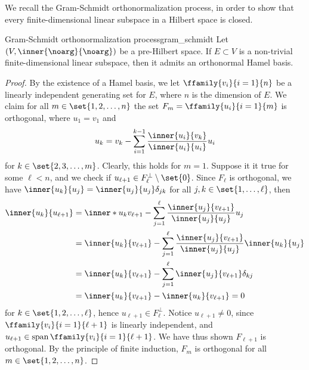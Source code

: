 We recall the Gram-Schmidt orthonormalization process, in order to show that every finite-dimensional linear subspace in a Hilbert space is closed.
\begin{lemma}{Gram-Schmidt orthonormalization process}{gram_schmidt}
    Let \((V, \inner{\noarg}{\noarg})\) be a pre-Hilbert space. If \(E \subset V\) is a non-trivial finite-dimensional linear subspace, then it admits an orthonormal Hamel basis.
\end{lemma}
\begin{proof}
    By the existence of a Hamel basis, we let \(\ffamily{v_i}{i=1}{n}\) be a linearly independent generating set for \(E\), where \(n\) is the dimension of \(E\). We claim for all \(m \in \set{1, 2, \dots, n}\) the set \(F_m = \ffamily{u_i}{i=1}{m}\) is orthogonal, where \(u_1 = v_1\) and
    \begin{equation*}
        u_k = v_k - \sum_{i = 1}^{k-1} \frac{\inner{u_i}{v_k}}{\inner{u_i}{u_i}} u_i
    \end{equation*}
    for \(k \in \set{2, 3, \dots, m}\). Clearly, this holds for \(m = 1\). Suppose it it true for some \(\ell < n\), and we check if \(u_{\ell+1} \in F_\ell^\perp \setminus \set{0}\). Since \(F_\ell\) is orthogonal, we have \(\inner{u_k}{u_j} = \inner{u_j}{u_j} \delta_{jk}\) for all \(j,k \in \set{1,\dots, \ell}\), then
    \begin{align*}
        \inner{u_k}{u_{\ell+1}} &= \inner*{u_k}{v_{\ell+1} - \sum_{j = 1}^{\ell} \frac{\inner{u_j}{v_{\ell+1}}}{\inner{u_j}{u_j}} u_j}\\
                                &= \inner{u_k}{v_{\ell+1}} - \sum_{j=1}^{\ell} \frac{\inner{u_j}{v_{\ell+1}}}{\inner{u_j}{u_j}} \inner{u_k}{u_j}\\
                                &= \inner{u_k}{v_{\ell+1}} - \sum_{j=1}^{\ell} \inner{u_j}{v_{\ell+1}}\delta_{kj}\\
                                &= \inner{u_k}{v_{\ell+1}} - \inner{u_k}{v_{\ell+1}} = 0
    \end{align*}
    for \(k \in \set{1,2, \dots, \ell}\), hence \(u_{\ell+1} \in F_\ell^\perp\). Notice \(u_{\ell+1} \neq 0\), since \(\ffamily{v_i}{i=1}{\ell+1}\) is linearly independent, and \(u_{\ell+1} \in \lspan\ffamily{v_i}{i=1}{\ell+1}\). We have thus shown \(F_{\ell+1}\) is orthogonal. By the principle of finite induction, \(F_m\) is orthogonal for all \(m \in \set{1,2,\dots, n}\).


\end{proof}
